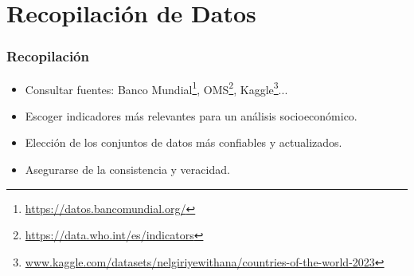 \documentclass{beamer}
\newcommand{\slideauthor}[1]{\gdef\insertslideauthor{#1}}
\newcommand{\insertslideauthor}{}
\begin{document}
\section{Recopilación de Datos}
\begin{frame}
\frametitle{Recopilación}
\slideauthor{Javier Comyn}
\begin{itemize}
    \item Consultar fuentes: Banco Mundial\footnote{\url{https://datos.bancomundial.org/}}, OMS\footnote{\url{https://data.who.int/es/indicators}}, Kaggle\footnote{\url{www.kaggle.com/datasets/nelgiriyewithana/countries-of-the-world-2023}}...
    \item Escoger indicadores más relevantes para un análisis socioeconómico.
    \item Elección de los conjuntos de datos más confiables y actualizados.
    \item Asegurarse de la consistencia y veracidad.
\end{itemize}
\end{frame}
\end{document}
